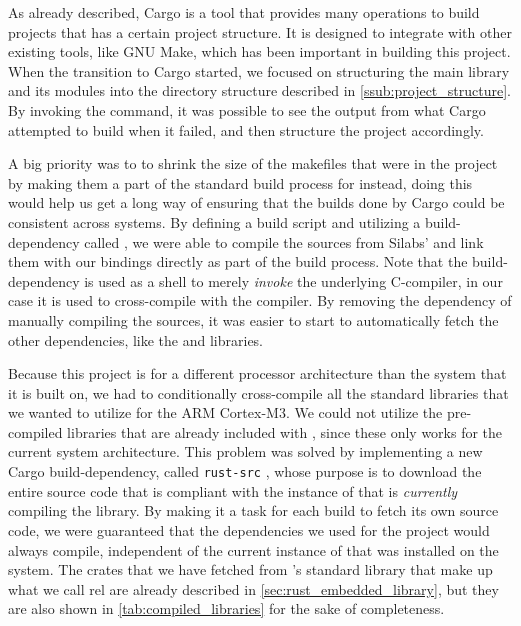 As already described, Cargo is a tool that provides many operations to build {\rust} projects that has a certain project structure.
It is designed to integrate with other existing tools, like GNU Make, which has been important in  building this project.
When the transition to Cargo started, we focused on structuring the main library and its modules into the directory structure described in \autoref{ssub:project_structure}.
By invoking the  command, it was possible to see the output from what Cargo attempted to build when it failed, and then structure the project accordingly.

A big priority was to to shrink the size of the makefiles that were in the project by making them a part of the standard build process for {\emlib} instead, doing this would help us get a long way of ensuring that the builds done by Cargo could be consistent across systems.
By defining a {\rust} build script and utilizing a {\rust} build-dependency called  \cite{web:cargo_gcc}, we were able to compile the {\C} sources from Silabs' {\emlib} and link them with our bindings directly as part of the build process.
Note that the  build-dependency is used as a shell to merely \emph{invoke} the underlying C-compiler, in our case it is used to cross-compile with the {\armgcc} compiler.
By removing the dependency of manually compiling the {\C} sources, it was easier to start to automatically fetch the other dependencies, like the {\core} and  libraries.

Because this project is for a different processor architecture than the system that it is built on, we had to conditionally cross-compile all the standard {\rust} libraries that we wanted to utilize for the ARM Cortex-M3.
We could not utilize the pre-compiled libraries that are already included with {\rustc}, since these only works for the current system architecture.
This problem was solved by implementing a new Cargo build-dependency, called \texttt{rust-src} \cite{github:rust_src}, whose purpose is to download the entire {\rust} source code that is compliant with the instance of {\rustc} that is \emph{currently} compiling the library.
By making it a task for each build to fetch its own source code, we were guaranteed that the dependencies we used for the project would always compile, independent of the current instance of {\rustc} that was installed on the system.
The crates that we have fetched from {\rust}'s standard library that make up what we call \gls{rel} are already described in \autoref{sec:rust_embedded_library}, but they are also shown in \autoref{tab:compiled_libraries} for the sake of completeness.

